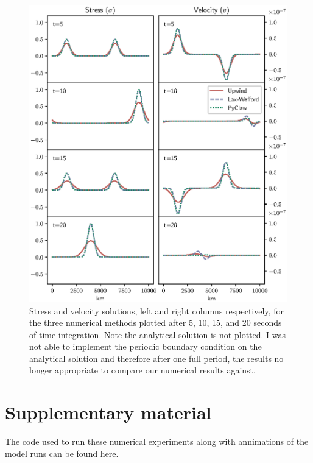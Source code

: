 \documentclass[review,onefignum,onetabnum]{siamart171218}
\begin{document}
\begin{figure}
    \centering
    \includegraphics[width=\textwidth]{figs/longrun.eps}
    \caption{Stress and velocity solutions, left and right columns respectively, for the three numerical methods plotted after 5, 10, 15, and 20 seconds of time integration. Note the analytical solution is not plotted. I was not able to implement the periodic boundary condition on the analytical solution and therefore after one full period, the results no longer appropriate to compare our numerical results against. }
    \label{fig:longrun}
\end{figure}
\section*{Supplementary material}
The code used to run these numerical experiments along with annimations of the model runs can be found  \href{https://github.com/andrewdnolan/MATH-709-Final-Project}{here}.



\end{document}
